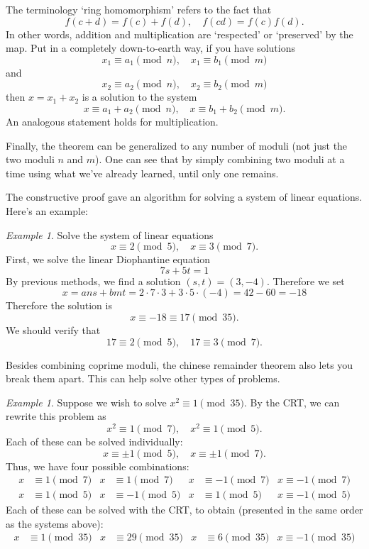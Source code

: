 \documentclass{article}
\theoremstyle{plain}
\theoremstyle{definition}
\theoremstyle{remark}
\newtheorem{example}[theorem]{Example}
\numberwithin{theorem}{section}
\begin{document}
The terminology `ring homomorphism' refers to the fact that
\[
f(c+d) = f(c) + f(d), \quad f(cd) = f(c)f(d).
\]
In other words, addition and multiplication are `respected' or `preserved' by the map.  Put in a completely down-to-earth way, if you have solutions
\[
x_1 \equiv a_1 \pmod{n}, \quad  x_1 \equiv b_1 \pmod{m}
\]
and
\[
x_2 \equiv a_2 \pmod{n}, \quad  x_2 \equiv b_2 \pmod{m}
\]
then $x = x_1 + x_2$ is a solution to the system
\[
x \equiv a_1 + a_2 \pmod{n}, \quad x \equiv b_1 + b_2 \pmod{m}.
\]
An analogous statement holds for multiplication.

Finally, the theorem can be generalized to any number of moduli (not just the two moduli $n$ and $m$).  One can see that by simply combining two moduli at a time using what we've already learned, until only one remains.

The constructive proof gave an algorithm for solving a system of linear equations.  Here's an example:

\begin{example}
Solve the system of linear equations
\[
x \equiv 2 \pmod{5}, \quad x \equiv 3 \pmod{7}.
\]
First, we solve the linear Diophantine equation
\[
7s + 5t = 1
\]
By previous methods, we find a solution $(s,t) = (3,-4)$.  Therefore we set
\[
x = ans + bmt = 2 \cdot 7 \cdot 3 + 3 \cdot 5 \cdot (-4) = 42 - 60 = -18
\]
Therefore the solution is
\[
x \equiv -18 \equiv 17 \pmod{35}.
\]
We should verify that
\[
17 \equiv 2 \pmod{5}, \quad 17 \equiv 3 \pmod{7}.
\]
\end{example}

Besides combining coprime moduli, the chinese remainder theorem also lets you break them apart.  This can help solve other types of problems.

\begin{example}

Suppose we wish to solve $x^2 \equiv 1 \pmod{35}$.  By the CRT, we can rewrite this problem as
\[
x^2 \equiv 1 \pmod{7}, \quad
x^2 \equiv 1 \pmod{5}.
\]
Each of these can be solved individually:
\[
x \equiv \pm 1 \pmod{5}, \quad
x \equiv \pm 1 \pmod{7}.
\]
Thus, we have four possible combinations:
\begin{align*}
x &\equiv 1 \pmod{7} &x &\equiv 1 \pmod 7 &x &\equiv -1 \pmod 7 &x \equiv -1 \pmod 7 \\
x &\equiv 1 \pmod{5} &x &\equiv -1 \pmod 5 &x &\equiv 1 \pmod 5 &x \equiv -1 \pmod 5
\end{align*}
Each of these can be solved with the CRT, to obtain (presented in the same order as the systems above):
\begin{align*}
x &\equiv 1 \pmod{35} &x &\equiv 29 \pmod{35} &x &\equiv 6 \pmod{35} &x \equiv -1 \pmod{35}
\end{align*}
\end{example}
\end{document}
